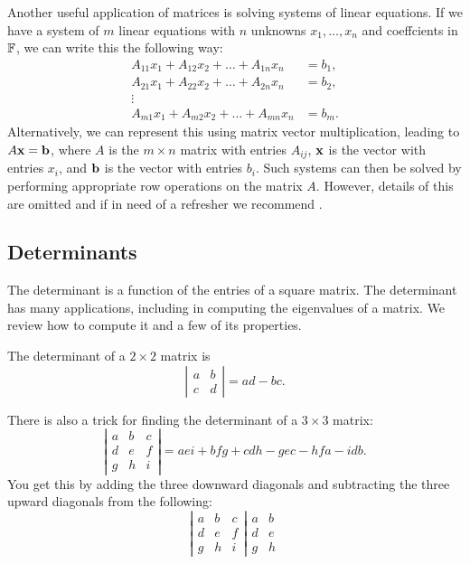 \documentclass{article}
\begin{document}
Another useful application of matrices is solving systems of linear equations. If we have a system of $m$ linear equations with $n$ unknowns $x_1,\ldots, x_n$ and coeffcients in ${\mathbb{F}}$, we can write this the following way:
\begin{align*}
    A_{11} x_1 + A_{12}x_2 + \ldots + A_{1n}x_n &= b_1,\\
     A_{21} x_1 + A_{22}x_2 + \ldots + A_{2n}x_n &= b_2,\\
     \vdots& \\
      A_{m1} x_1 + A_{m2}x_2 + \ldots + A_{mn}x_n &= b_m.
\end{align*}
Alternatively, we can represent this using matrix vector multiplication, leading to $A\bold{x} = \bold{b}$, where $A$ is the $m\times n$ matrix with entries $A_{ij}$, $\bold{x}$ is the vector with entries $x_i$, and $\bold{b}$ is the vector with entries $b_i$. Such systems can then be solved by performing appropriate row operations on the matrix $A$. However, details of this are omitted and if in need of a refresher we recommend \cite[Chapter 2]{linalgwrong}.


\subsection{Determinants}
The determinant is a function of the entries of a square matrix. The determinant has many applications, including in computing the eigenvalues of a matrix. We review how to compute it and a few of its properties. 

The determinant of a $2 \times 2$ matrix is 
$$\left| \begin{matrix} a & b \\ c & d \end{matrix} \right| = ad-bc.$$

There is also a trick for finding the determinant of a $3 \times 3$ matrix:
$$\left| \begin{matrix} a & b &c \\ d & e & f \\ g & h &i \end{matrix} \right| = aei + bfg + cdh - gec -hfa -idb.$$
You get this by adding the three downward diagonals and subtracting the three upward diagonals from the following:
$$ \left| \begin{matrix} a & b &c \\ d & e & f \\ g & h &i \end{matrix} \right| \begin{matrix} a & b \\ d & e\\g & h  \end{matrix} $$
\end{document}
